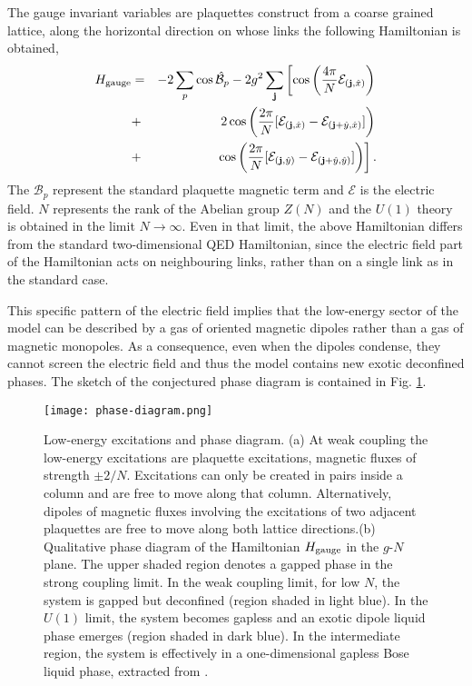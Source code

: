 \documentclass[epj,final]{svjour}
\begin{document}
The gauge invariant variables are plaquettes construct from a coarse grained lattice, along the horizontal direction on whose links the following Hamiltonian is obtained, 
\begin{eqnarray}\label{eq:gaugeham}
{H_{\rm gauge}} &=& -2\sum_{p} \cos\hat{\mathcal{B}}_p - 2g^2 \sum_{\mathbf j} \left[ \cos\left ( \frac{4\pi}{N} \mathcal{E}_{({\mathbf j},\hat{x})}\right ) \right.\nonumber\\
&+& \left. 2\cos\left(\frac{2\pi}{N}[\mathcal{E}_{({\mathbf j},\hat{x})}-\mathcal{E}_{({\mathbf j}+\hat{y},\hat{x})}]\right)\right.\nonumber\\
&+&  \left.\cos\left(\frac{2\pi}{N}[\mathcal{E}_{({\mathbf j},\hat{y})}-\mathcal{E}_{({\mathbf j}+\hat{y},\hat{y})}]\right) \right].  
\end{eqnarray}
The $\mathcal{B}_p$ represent the standard plaquette magnetic term  and $\mathcal{E}$ is the electric field. $N$ represents the rank of the Abelian group $Z(N)$ and the $U(1)$ theory is obtained in the limit $N\to \infty$. Even in that limit, the above Hamiltonian differs from the standard two-dimensional QED Hamiltonian, since the electric field part of the Hamiltonian acts on neighbouring links, rather than on a single link as in the standard case.

This specific pattern of the electric field implies that the low-energy sector of the model can be described by a gas of oriented magnetic dipoles rather than a gas of magnetic monopoles. As a consequence, even when the dipoles condense, they cannot screen the electric field and thus the model contains new exotic deconfined phases. The sketch of the conjectured  phase diagram is contained in Fig. \ref{fig:phasediagram}.
\begin{figure}
\texttt{[image: phase-diagram.png]}
\caption{Low-energy excitations and phase diagram. (a) At weak coupling the low-energy excitations are plaquette excitations, magnetic fluxes of strength $\pm 2/N$. Excitations can only be created in pairs inside a column and are free to move along that column. Alternatively, dipoles of magnetic fluxes involving the excitations of two adjacent plaquettes are free to move along both lattice directions.(b) Qualitative phase diagram of the Hamiltonian $H_{\rm gauge}$ in the $g$-$N$ plane. The upper shaded region denotes a gapped phase in the strong coupling limit. In the weak coupling limit, for low $N$, the system is gapped but deconfined (region shaded in light blue). In the $U(1)$ limit, the system becomes gapless and an exotic dipole liquid phase emerges (region shaded in dark blue). In the intermediate region, the system is effectively in a one-dimensional gapless Bose liquid phase\label{fig:phasediagram}, extracted from \cite{dutta2017toolbox}.}
\end{figure}
\end{document}
